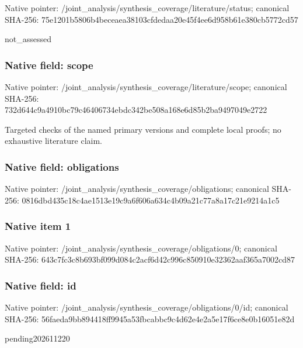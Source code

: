 \documentclass[10pt,a4paper]{article}
\begin{document}
Native pointer: /joint\_analysis/synthesi\allowbreak{}s\_coverage/literature/st\allowbreak{}atus; canonical SHA-256: 75e1201b5806b4beceaea381\allowbreak{}03cfdedaa20e45f4ee6d958b\allowbreak{}61e380cb5772cd57


not\_assessed


\subsubsection{Native field: scope}


Native pointer: /joint\_analysis/synthesi\allowbreak{}s\_coverage/literature/sc\allowbreak{}ope; canonical SHA-256: 732d644c9a4910bc79c46406\allowbreak{}734ebdc342be508a168e6d85\allowbreak{}b2ba9497049e2722


Targeted checks of the named primary versions and complete local proofs; no exhaustive literature claim.


\subsubsection{Native field: obligations}


Native pointer: /joint\_analysis/synthesi\allowbreak{}s\_coverage/obligations; canonical SHA-256: 0816dbd435c18c4ae1513e19\allowbreak{}c9a6f606a634c4b09a21c77a\allowbreak{}8a17c21e9214a1c5



\subsubsection{Native item 1}


Native pointer: /joint\_analysis/synthesi\allowbreak{}s\_coverage/obligations/0; canonical SHA-256: 643c7fc3c8b693bf099d084c\allowbreak{}2acf6d42c996c850910e3236\allowbreak{}2aaf365a7002cd87



\subsubsection{Native field: id}


Native pointer: /joint\_analysis/synthesi\allowbreak{}s\_coverage/obligations/0\allowbreak{}/id; canonical SHA-256: 56faeda9bb894418ff9945a5\allowbreak{}3fbcabbc9c4d62e4e2a5e17f\allowbreak{}6ce8e0b16051e82d


pending202611220
\end{document}
